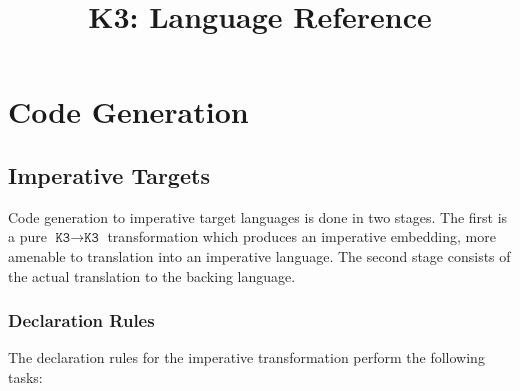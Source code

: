 \documentclass{article}
\title{K3: Language Reference}
\author{}
\date{}
\newcommand{\K}{\ensuremath{\texttt{K3}}}
\begin{document}
    \maketitle

    \tableofcontents

    \todototoc
    \listoftodos

    \section{Code Generation}
    \subsection{Imperative Targets}

    Code generation to imperative target languages is done in two stages. The first is a pure $\K
    \rightarrow \K$ transformation which produces an imperative embedding, more amenable to
    translation into an imperative language. The second stage consists of the actual translation to
    the backing language.

    \subsubsection{Declaration Rules}

    The declaration rules for the imperative transformation perform the following tasks:
\end{document}
